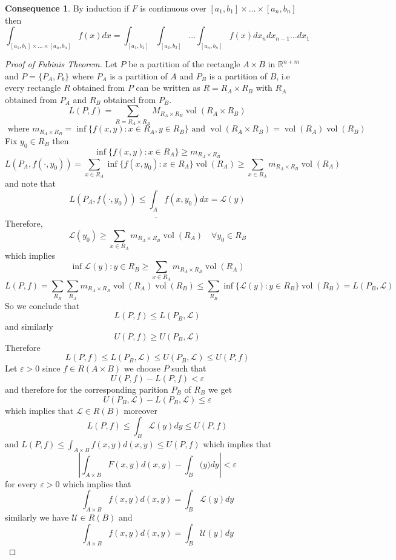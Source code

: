 \documentclass[11pt,openany]{book}
\theoremstyle{plain}
\theoremstyle{definition}
\newtheorem{consequence}{Consequence}[chapter]
\theoremstyle{remark}
\newcommand{\R}{\mathbb{R}}
\newcommand{\eps}{\varepsilon}
\newcommand{\vol}{\operatorname{vol}}
\begin{document}
\begin{consequence}
    By induction if $F$ is continuous over $[a_1,b_1] \times \dots \times [a_n,b_n]$ then \[\int_{[a_1,b_1] \times \dots \times [a_n,b_n]}f(x)dx = \int_{[a_1,b_1]} \int _{[a_2,b_2]} \dots \int_{[a_n,b_n]} f(x) dx_ndx_{n-1} \dots dx_1\]
\end{consequence}
\begin{proof}[Proof of Fubinis Theorem]
    Let $P$ be a partition of the rectangle $A \times B$ in $\R^{n+m}$ and $P = \{P_A,P_b\}$ where $P_A$ is a partition of $A$ and $P_B$ is a partition of $B$, i.e every rectangle $R$ obtained from $P$ can be written as $R = R_A \times R_B$ with $R_A$ obtained from $P_A$ and $R_B$ obtained from $P_B$. \[L(P,f) = \sum_{R = R_A\times R_B} M_{R_A \times R_B}\vol(R_A \times R_B) \] \[\text{ where } m_{R_A \times R_B} = \inf\{f(x,y): x \in R_A, y \in R_B\} \text{ and } \vol(R_A \times R_B) = \vol(R_A)\vol(R_B)\] Fix $y_0 \in R_B$ then \[\inf\{f(x,y): x \in R_A\} \ge m_{R_A \times R_B}\] \[L(P_A,f(\cdot ,y_0)) = \sum_{x \in R_A} \inf \{f(x,y_0): x \in R_A\} \vol(R_A) \ge \sum_{x \in R_A} m_{R_A\times R_B}\vol(R_A)\] and note that \[L(P_A, f(\cdot, y_0)) \le \underline{\int_A}f(x,y_0)dx = \mathcal{L}(y)\] Therefore, \[\mathcal{L}(y_0) \ge \sum_{x\in R_A}m_{R_A \times R_B} \vol(R_A) \quad \forall y_0 \in R_B\] which implies \[\inf{\mathcal{L}(y): y \in R_B} \ge \sum_{x \in R_A} m_{R_A \times R_B}\vol(R_A)\] \[L(P,f) = \sum_{R_B}\sum_{R_A}m_{R_A \times R_B}\vol(R_A)\vol(R_B) \le \sum_{R_B} \inf\{\mathcal{L}(y): y \in R_B\}\vol(R_B) = L(P_B, \mathcal{L})\] So we conclude that \[L(P,f) \le L(P_B, \mathcal{L})\] and similarly  \[U(P,f) \ge U(P_B,\mathcal{L})\] Therefore \[L(P,f) \le L(P_B,\mathcal{L}) \le U(P_B, \mathcal{L}) \le U(P,f)\] Let $\eps >0$ since $f \in R (A \times B)$ we choose $P$ such that \[U(P,f) - L(P,f) < \eps\] and therefore for the corresponding parition $P_B$ of $R_B$ we get \[U(P_B, \mathcal{L}) - L(P_B, \mathcal{L}) \le \eps\] which implies that $\mathcal{L} \in R(B)$ moreover \[L(P,f) \le \int_B \mathcal{L}(y) dy \le U(P,f)\] and $L(P,f) \le \int_{A \times B} f(x,y)d(x,y) \le U(P,f)$ which implies that \[|\int_{A \times B} F(x,y)d(x,y) - \int_B \mathcal(y) dy| < \eps\] for every $\eps >0$ which implies that \[\int_{A \times B} f(x,y)d(x,y) = \int_B \mathcal{L}(y) dy\] similarly we have $\mathcal{U} \in R(B)$ and \[\int_{A \times B} f(x,y)d(x,y) = \int_B \mathcal{U}(y) dy\]
\end{proof}
\end{document}
